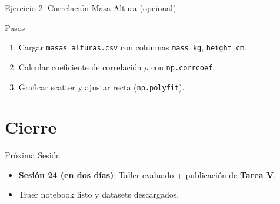 \documentclass[10pt]{beamer}
\begin{document}
\begin{frame}{Ejercicio 2: Correlación Masa-Altura (opcional)}
  \begin{block}{Pasos}
    \begin{enumerate}
      \item Cargar \texttt{masas\_alturas.csv} con columnas \texttt{mass\_kg}, \texttt{height\_cm}.
      \item Calcular coeficiente de correlación \(\rho\) con \texttt{np.corrcoef}.
      \item Graficar scatter y ajustar recta (\texttt{np.polyfit}).
    \end{enumerate}
  \end{block}
\end{frame}

\section{Cierre}
\begin{frame}{Próxima Sesión}
  \begin{itemize}
    \item \textbf{Sesión 24 (en dos días)}: Taller evaluado + publicación de \textbf{Tarea V}.
    \item Traer notebook listo y datasets descargados.
  \end{itemize}
\end{frame}
\end{document}
